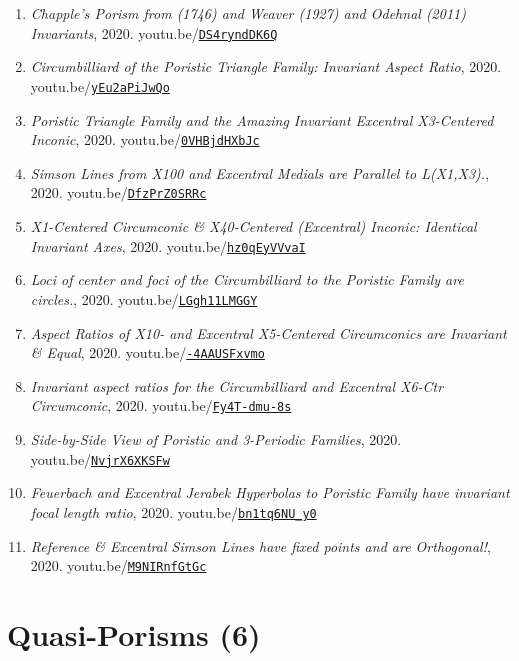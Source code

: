 \documentclass[12pt]{article}
\begin{document}
\begin{enumerate}[resume]
\item \textit{Chapple's Porism from (1746) and Weaver (1927) and Odehnal (2011) Invariants}, 2020. youtu.be/\href{https://youtu.be/DS4ryndDK6Q}{\nolinkurl{DS4ryndDK6Q}}
\item \textit{Circumbilliard of the Poristic Triangle Family: Invariant Aspect Ratio}, 2020. youtu.be/\href{https://youtu.be/yEu2aPiJwQo}{\nolinkurl{yEu2aPiJwQo}}
\item \textit{Poristic Triangle Family and the Amazing Invariant Excentral X3-Centered Inconic}, 2020. youtu.be/\href{https://youtu.be/0VHBjdHXbJc}{\nolinkurl{0VHBjdHXbJc}}
\item \textit{Simson Lines from X100 and Excentral Medials are Parallel to L(X1,X3).}, 2020. youtu.be/\href{https://youtu.be/DfzPrZ0SRRc}{\nolinkurl{DfzPrZ0SRRc}}
\item \textit{X1-Centered Circumconic \& X40-Centered (Excentral) Inconic: Identical Invariant Axes}, 2020. youtu.be/\href{https://youtu.be/hz0qEyVVvaI}{\nolinkurl{hz0qEyVVvaI}}
\item \textit{Loci of center and foci of the Circumbilliard to the Poristic Family are circles.}, 2020. youtu.be/\href{https://youtu.be/LGgh11LMGGY}{\nolinkurl{LGgh11LMGGY}}
\item \textit{Aspect Ratios of X10- and Excentral X5-Centered Circumconics are Invariant \& Equal}, 2020. youtu.be/\href{https://youtu.be/-4AAUSFxvmo}{\nolinkurl{-4AAUSFxvmo}}
\item \textit{Invariant aspect ratios for the Circumbilliard and Excentral X6-Ctr Circumconic}, 2020. youtu.be/\href{https://youtu.be/Fy4T-dmu-8s}{\nolinkurl{Fy4T-dmu-8s}}
\item \textit{Side-by-Side View of Poristic and 3-Periodic Families}, 2020. youtu.be/\href{https://youtu.be/NvjrX6XKSFw}{\nolinkurl{NvjrX6XKSFw}}
\item \textit{Feuerbach and Excentral Jerabek Hyperbolas to Poristic Family have invariant focal length ratio}, 2020. youtu.be/\href{https://youtu.be/bn1tq6NU_y0}{\nolinkurl{bn1tq6NU\_y0}}
\item \textit{Reference \& Excentral Simson Lines have fixed points and are Orthogonal!}, 2020. youtu.be/\href{https://youtu.be/M9NIRnfGtGc}{\nolinkurl{M9NIRnfGtGc}}
\end{enumerate}

\section{Quasi-Porisms (6)}
\end{document}
